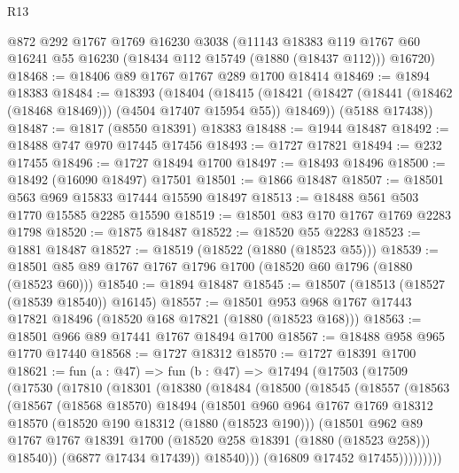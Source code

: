\begin{lexlean}{R13}
\begin{coremodule}
    @872
    @292
    @1767
    @1769
    @16230
    @3038
    (@11143
      @18383
      @119
      @1767
      @60
      @16241
      @55
      @16230
      (@18434 @112 @15749 (@1880 (@18437 @112)))
      @16720)
@18468 := @18406 @89 @1767 @1767 @289 @1700 @18414
@18469 := @1894 @18383
@18484 := @18393
    (@18404
      (@18415 (@18421 (@18427 (@18441 (@18462 (@18468 @18469))) (@4504 @17407 @15954 @55)) @18469))
      (@5188 @17438))
@18487 := @1817 (@8550 @18391) @18383
@18488 := @1944 @18487
@18492 := @18488 @747 @970 @17445 @17456
@18493 := @1727 @17821
@18494 := @232 @17455
@18496 := @1727 @18494 @1700
@18497 := @18493 @18496
@18500 := @18492 (@16090 @18497) @17501
@18501 := @1866 @18487
@18507 := @18501 @563 @969 @15833 @17444 @15590 @18497
@18513 := @18488 @561 @503 @1770 @15585 @2285 @15590
@18519 := @18501 @83 @170 @1767 @1769 @2283 @1798
@18520 := @1875 @18487
@18522 := @18520 @55 @2283
@18523 := @1881 @18487
@18527 := @18519 (@18522 (@1880 (@18523 @55)))
@18539 := @18501 @85 @89 @1767 @1767 @1796 @1700 (@18520 @60 @1796 (@1880 (@18523 @60)))
@18540 := @1894 @18487
@18545 := @18507 (@18513 (@18527 (@18539 @18540)) @16145)
@18557 := @18501 @953 @968 @1767 @17443 @17821 @18496 (@18520 @168 @17821 (@1880 (@18523 @168)))
@18563 := @18501 @966 @89 @17441 @1767 @18494 @1700
@18567 := @18488 @958 @965 @1770 @17440
@18568 := @1727 @18312
@18570 := @1727 @18391 @1700
@18621 := fun (a : @47) =>
  fun (b : @47) =>
  @17494
    (@17503
      (@17509
        (@17530
          (@17810
            (@18301
              (@18380
                (@18484
                  (@18500
                    (@18545
                      (@18557
                        (@18563
                          (@18567
                            (@18568 @18570)
                            @18494
                            (@18501
                              @960
                              @964
                              @1767
                              @1769
                              @18312
                              @18570
                              (@18520 @190 @18312 (@1880 (@18523 @190)))
                              (@18501
                                @962
                                @89
                                @1767
                                @1767
                                @18391
                                @1700
                                (@18520 @258 @18391 (@1880 (@18523 @258)))
                                @18540))
                            (@6877 @17434 @17439))
                          @18540)))
                    (@16809 @17452 @17455)))))))))

\end{coremodule}
\end{lexlean}
